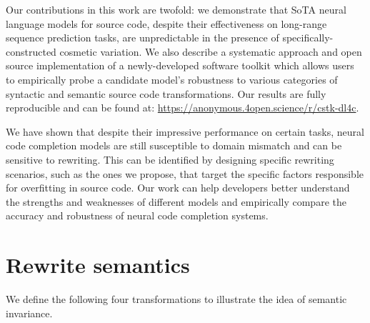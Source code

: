 \documentclass[usenames,dvipsnames]{article} %
\begin{document}
  Our contributions in this work are twofold: we demonstrate that SoTA neural language models for source code, despite their effectiveness on long-range sequence prediction tasks, are unpredictable in the presence of specifically-constructed cosmetic variation. We also describe a systematic approach and open source implementation of a newly-developed software toolkit which allows users to empirically probe a candidate model's robustness to various categories of syntactic and semantic source code transformations. Our results are fully reproducible and can be found at: \url{https://anonymous.4open.science/r/cstk-dl4c}.

  We have shown that despite their impressive performance on certain tasks, neural code completion models are still susceptible to domain mismatch and can be sensitive to rewriting. This can be identified by designing specific rewriting scenarios, such as the ones we propose, that target the specific factors responsible for overfitting in source code. Our work can help developers better understand the strengths and weaknesses of different models and empirically compare the accuracy and robustness of neural code completion systems.

  
  
  \pagebreak
  \appendix
  \section{Rewrite semantics}\label{sec:rewrite_semantics}

  We define the following four transformations to illustrate the idea of semantic invariance.
\end{document}
